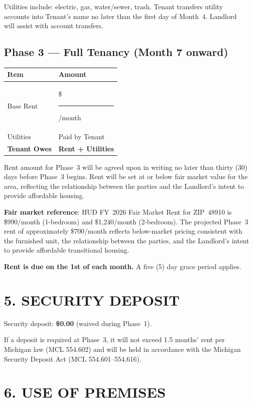 \documentclass[11pt]{article}
\begin{document}
\medskip
Utilities include: electric, gas, water/sewer, trash. Tenant transfers
utility accounts into Tenant's name no later than the first day of
Month~4. Landlord will assist with account transfers.

\subsection{Phase 3 --- Full Tenancy (Month 7 onward)}

\begin{tabular}{ll}
\toprule
Item & Amount \\
\midrule
Base Rent & \$\rule{2cm}{0.4pt}/month \\
Utilities & Paid by Tenant \\
\textbf{Tenant Owes} & \textbf{Rent + Utilities} \\
\bottomrule
\end{tabular}

\medskip
Rent amount for Phase~3 will be agreed upon in writing no later than
thirty (30) days before Phase~3 begins. Rent will be set at or below
fair market value for the area, reflecting the relationship between the
parties and the Landlord's intent to provide affordable housing.

\textbf{Fair market reference}: HUD FY~2026 Fair Market Rent for
ZIP~48910 is \$990/month (1-bedroom) and \$1,240/month (2-bedroom).
The projected Phase~3 rent of approximately \$700/month reflects
below-market pricing consistent with the furnished unit, the
relationship between the parties, and the Landlord's intent to provide
affordable transitional housing.

\textbf{Rent is due on the 1st of each month.} A five (5) day grace
period applies.

\section{5. SECURITY DEPOSIT}

Security deposit: \textbf{\$0.00} (waived during Phase~1).

If a deposit is required at Phase~3, it will not exceed 1.5 months'
rent per Michigan law (MCL 554.602) and will be held in accordance with
the Michigan Security Deposit Act (MCL 554.601--554.616).

\section{6. USE OF PREMISES}
\end{document}
